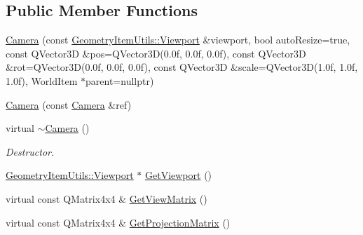 \subsection*{Public Member Functions}
\begin{DoxyCompactItemize}
\item 
\mbox{\hyperlink{class_geometry_engine_1_1_geometry_world_item_1_1_geometry_camera_1_1_camera_a56a7538e5e5d2141832824bba448e271}{Camera}} (const \mbox{\hyperlink{class_geometry_engine_1_1_geometry_item_utils_1_1_viewport}{Geometry\+Item\+Utils\+::\+Viewport}} \&viewport, bool auto\+Resize=true, const Q\+Vector3D \&pos=Q\+Vector3D(0.\+0f, 0.\+0f, 0.\+0f), const Q\+Vector3\+D \&rot=\+Q\+Vector3\+D(0.\+0f, 0.\+0f, 0.\+0f), const Q\+Vector3\+D \&scale=\+Q\+Vector3\+D(1.\+0f, 1.\+0f, 1.\+0f), World\+Item $\ast$parent=nullptr)
\item 
\mbox{\hyperlink{class_geometry_engine_1_1_geometry_world_item_1_1_geometry_camera_1_1_camera_afac761f35401ea99ef72dd2412b71cfc}{Camera}} (const \mbox{\hyperlink{class_geometry_engine_1_1_geometry_world_item_1_1_geometry_camera_1_1_camera}{Camera}} \&ref)
\item 
\mbox{\label{class_geometry_engine_1_1_geometry_world_item_1_1_geometry_camera_1_1_camera_ae9c09265af967800c32373f9c79d56c6}} 
virtual \mbox{\hyperlink{class_geometry_engine_1_1_geometry_world_item_1_1_geometry_camera_1_1_camera_ae9c09265af967800c32373f9c79d56c6}{$\sim$\+Camera}} ()
\begin{DoxyCompactList}\small\item\em Destructor. \end{DoxyCompactList}\item 
\mbox{\hyperlink{class_geometry_engine_1_1_geometry_item_utils_1_1_viewport}{Geometry\+Item\+Utils\+::\+Viewport}} $\ast$ \mbox{\hyperlink{class_geometry_engine_1_1_geometry_world_item_1_1_geometry_camera_1_1_camera_af0cbe2d79ec50e1ecdec1e81be08163e}{Get\+Viewport}} ()
\item 
virtual const Q\+Matrix4x4 \& \mbox{\hyperlink{class_geometry_engine_1_1_geometry_world_item_1_1_geometry_camera_1_1_camera_a140ec366f6b9b9df8ed9134c612cbac6}{Get\+View\+Matrix}} ()
\item 
virtual const Q\+Matrix4x4 \& \mbox{\hyperlink{class_geometry_engine_1_1_geometry_world_item_1_1_geometry_camera_1_1_camera_ae08a02484b89c774a25f7f9aa783a026}{Get\+Projection\+Matrix}} ()
\item 

\end{DoxyCompactItemize}
